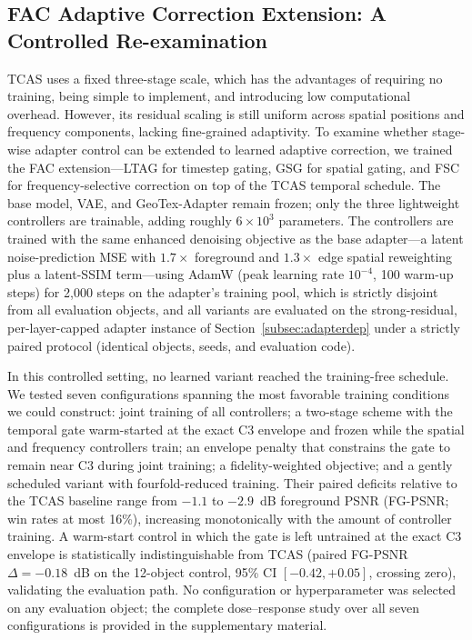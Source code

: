\documentclass[times,twocolumn,final]{elsarticle}
\begin{document}
\subsection{FAC Adaptive Correction Extension: A Controlled Re-examination}
\label{subsec:facexp}

TCAS uses a fixed three-stage scale, which has the advantages of requiring no training, being simple to implement, and introducing low computational overhead. However, its residual scaling is still uniform across spatial positions and frequency components, lacking fine-grained adaptivity. To examine whether stage-wise adapter control can be extended to learned adaptive correction, we trained the FAC extension---LTAG for timestep gating, GSG for spatial gating, and FSC for frequency-selective correction on top of the TCAS temporal schedule. The base model, VAE, and GeoTex-Adapter remain frozen; only the three lightweight controllers are trainable, adding roughly $6\times10^{3}$ parameters. The controllers are trained with the same enhanced denoising objective as the base adapter---a latent noise-prediction MSE with $1.7\times$ foreground and $1.3\times$ edge spatial reweighting plus a latent-SSIM term---using AdamW (peak learning rate $10^{-4}$, 100 warm-up steps) for 2{,}000 steps on the adapter's training pool, which is strictly disjoint from all evaluation objects, and all variants are evaluated on the strong-residual, per-layer-capped adapter instance of Section~\ref{subsec:adapterdep} under a strictly paired protocol (identical objects, seeds, and evaluation code).

In this controlled setting, no learned variant reached the training-free schedule. We tested seven configurations spanning the most favorable training conditions we could construct: joint training of all controllers; a two-stage scheme with the temporal gate warm-started at the exact C3 envelope and frozen while the spatial and frequency controllers train; an envelope penalty that constrains the gate to remain near C3 during joint training; a fidelity-weighted objective; and a gently scheduled variant with fourfold-reduced training. Their paired deficits relative to the TCAS baseline range from $-1.1$ to $-2.9$~dB foreground PSNR (FG-PSNR; win rates at most 16\%), increasing monotonically with the amount of controller training. A warm-start control in which the gate is left untrained at the exact C3 envelope is statistically indistinguishable from TCAS (paired FG-PSNR $\Delta=-0.18$~dB on the 12-object control, 95\% CI $[-0.42,+0.05]$, crossing zero), validating the evaluation path. No configuration or hyperparameter was selected on any evaluation object; the complete dose--response study over all seven configurations is provided in the supplementary material.
\end{document}
